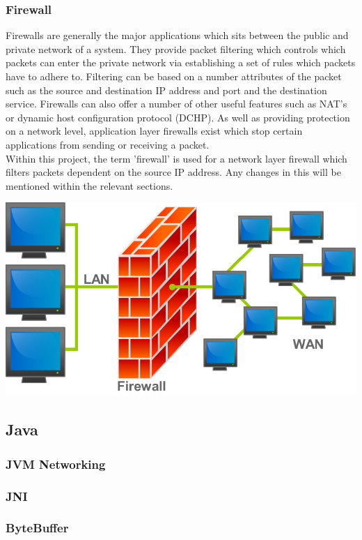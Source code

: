 \documentclass[a4paper, titlepage]{article}
\begin{document}
\subsubsection{Firewall}
Firewalls are generally the major applications which sits between the public and private network of a system. They provide packet filtering which controls which packets can enter the private network via establishing a set of rules which packets have to adhere to. Filtering can be based on a number attributes of the packet such as the source and destination IP address and port and the destination service. Firewalls can also offer a number of other useful features such as NAT's or dynamic host configuration protocol (DCHP). As well as providing protection on a network level, application layer firewalls exist which stop certain applications from sending or receiving a packet. \\
\newline
Within this project, the term 'firewall' is used for a network layer firewall which filters packets dependent on the source IP address. Any changes in this will be mentioned within the relevant sections.

\includegraphics[width=\textwidth]{images/firewall.png}

\subsection{Java}
\subsubsection{JVM Networking}
\subsubsection{JNI}
\subsubsection{ByteBuffer}
\end{document}
